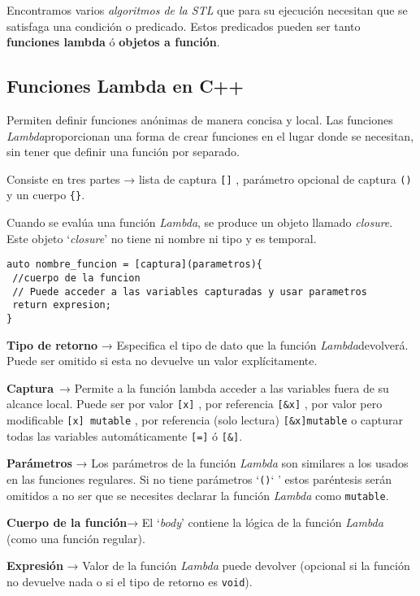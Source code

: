 Encontramos varios \textit{algoritmos de la STL} que para su ejecución necesitan que se satisfaga una condición o predicado.
Estos predicados pueden ser tanto \textbf{funciones lambda} ó \textbf{objetos a función}.

\subsection{Funciones Lambda en C++}
Permiten definir funciones anónimas de manera concisa y local. Las funciones \textit{Lambda}proporcionan una forma de crear funciones en el lugar donde se necesitan,
sin tener que definir una función por separado.

Consiste en tres partes → lista de captura \texttt{[]} , parámetro opcional de captura \texttt{()} y un cuerpo \texttt{\{\}}.

Cuando se evalúa una función \textit{Lambda}, se produce un objeto llamado \textit{closure}. Este objeto ‘\textit{closure}’ no tiene ni nombre ni tipo y es temporal.
\begin{center}
	\begin{lstlisting}[frame=single]
auto nombre_funcion = [captura](parametros){
 //cuerpo de la funcion
 // Puede acceder a las variables capturadas y usar parametros
 return expresion;
}
	\end{lstlisting}
\end{center}

\textbf{Tipo de retorno} → Especifica el tipo de dato que la función \textit{Lambda}devolverá. Puede ser omitido si esta no devuelve un valor explícitamente.

\textbf{Captura} → Permite a la función lambda acceder a las variables fuera de su alcance local. Puede ser por valor \texttt{[x]} , por referencia \texttt{[\&x]} , por valor pero modificable \texttt{[x] mutable} , por referencia (solo lectura) \texttt{[\&x]mutable} o capturar todas las variables automáticamente \texttt{[=]} ó \texttt{[\&]}.

\textbf{Parámetros} → Los parámetros de la función \textit{Lambda} son similares a los usados en las funciones regulares. Si no tiene parámetros ‘\texttt{()}` ’ estos paréntesis serán omitidos a no ser que se necesites declarar la función \textit{Lambda} como \texttt{mutable}.

\textbf{Cuerpo de la función}→ El ‘\textit{body}’ contiene la lógica de la función \textit{Lambda} (como una función regular).

\textbf{Expresión} → Valor de la función \textit{Lambda} puede devolver (opcional si la función no devuelve nada o si el tipo de retorno es \texttt{void}).


